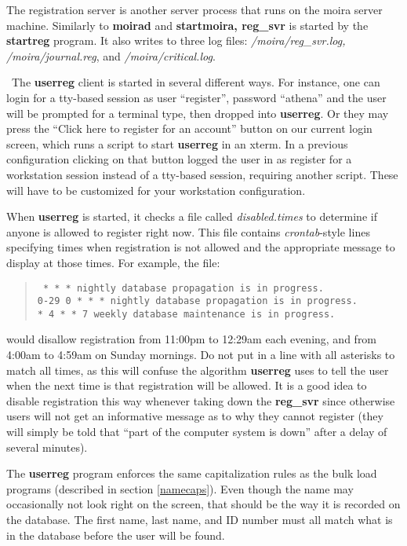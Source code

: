 The registration server is another server process that runs on the
moira server machine.  Similarly to {\bf moirad} and {\bf startmoira,
reg\_svr} is started by the {\bf startreg} program.  It also writes to
three log files: {\it /moira/reg\_svr.log, /moira/journal.reg}, and
{\it /moira/critical.log}.

\athena\ The {\bf userreg} client is started in several different
ways.  For instance, one can login for a tty-based session as user
``register'', password ``athena'' and the user will be prompted for a
terminal type, then dropped into {\bf userreg}.  Or they may press the
``Click here to register for an account'' button on our current login
screen, which runs a script to start {\bf userreg} in an xterm.  In a
previous configuration clicking on that button logged the user in as
register for a workstation session instead of a tty-based session,
requiring another script.  These will have to be customized for your
workstation configuration.

When {\bf userreg} is started, it checks a file called
{\em disabled.times} to determine if anyone is allowed to register right
now.  This file contains {\em crontab}-style lines specifying times when
registration is not allowed and the appropriate message to display at
those times.  For example, the file:
\begin{quotation}\tt
{} * * *	nightly database propagation is in progress.\\
0-29 0 * * *	nightly database propagation is in progress.\\
* 4 * * 7	weekly database maintenance is in progress.
\end{quotation}
would disallow registration from 11:00pm to 12:29am each evening, and
from 4:00am to 4:59am on Sunday mornings.  Do not put in a line with
all asterisks to match all times, as this will confuse the algorithm
{\bf userreg} uses to tell the user when the next time is that
registration will be allowed.  It is a good idea to disable
registration this way whenever taking down the {\bf reg\_svr} since
otherwise users will not get an informative message as to why they
cannot register (they will simply be told that ``part of the computer
system is down'' after a delay of several minutes).

The {\bf userreg} program enforces the same capitalization rules as
the bulk load programs (described in section \ref{namecaps}).  Even
though the name may occasionally not look right on the screen, that
should be the way it is recorded on the database.  The first name,
last name, and ID number must all match what is in the database before
the user will be found.


